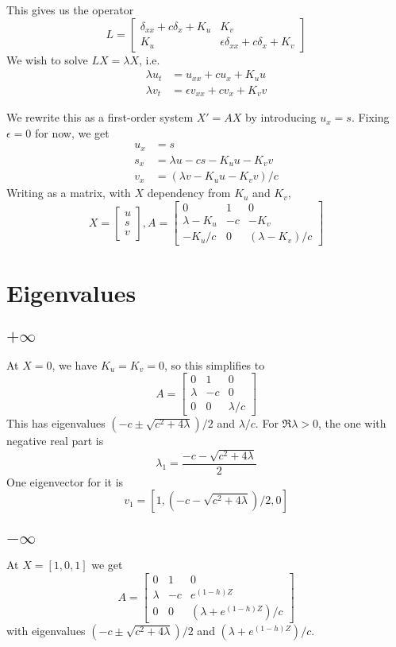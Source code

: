 \documentclass[10pt]{article}
\begin{document}
This gives us the operator
\[
L = \begin{bmatrix}
\delta_{xx} + c \delta_x + K_u  &  K_v  \\
K_u  &  \epsilon \delta_{xx} + c \delta_x + K_v
\end{bmatrix}
\]
We wish to solve $LX = \lambda X$, i.e.
\begin{align}
\lambda u_t &= u_{xx} + c u_x + K_u u \\
\lambda v_t &= \epsilon v_{xx} + c v_x+ K_v v
\end{align}

We rewrite this as a first-order system $X' = AX$ by introducing $u_x = s$.  Fixing $\epsilon=0$ for now, we get
\begin{align}
u_x &= s \\
s_x &= \lambda u - c s - K_u u - K_v v \\
v_x &= (\lambda v - K_u u - K_v v)/c
\end{align}
Writing as a matrix, with $X$ dependency from $K_u$ and $K_v$,
\[
X = \begin{bmatrix}u\\s\\v\end{bmatrix},
A = \begin{bmatrix}
0 & 1 & 0 \\
\lambda - K_u  &  -c  &  -K_v \\
- K_u/c  &  0  &  (\lambda - K_v)/c
\end{bmatrix}
\]

\section{Eigenvalues}
\subsection{$+\infty$}
At $X = 0$, we have $K_u = K_v = 0$, so this simplifies to
\[
A = \begin{bmatrix}
0 & 1 & 0 \\
\lambda &  -c  &  0 \\
0 &  0  &  \lambda/c
\end{bmatrix}
\]
This has eigenvalues $(-c \pm \sqrt{c^2 + 4 \lambda})/2$ and $\lambda/c$.  For $\Re \lambda > 0$, the one with negative real part is
\[\lambda_1 = \frac{-c - \sqrt{c^2 + 4 \lambda}}{2}\]
One eigenvector for it is
\[v_1 = [1,(-c - \sqrt{c^2 + 4 \lambda})/2,0] \]

\subsection{$-\infty$}
At $X = [1,0,1]$ we get
\[
A = \begin{bmatrix}
0 & 1 & 0 \\
\lambda &  -c  &  e^{(1-h)Z} \\
0 &  0  &  (\lambda + e^{(1-h)Z})/c
\end{bmatrix}
\]
with eigenvalues $(-c \pm \sqrt{c^2 + 4 \lambda})/2$ and $(\lambda + e^{(1-h)Z})/c$.
\end{document}
